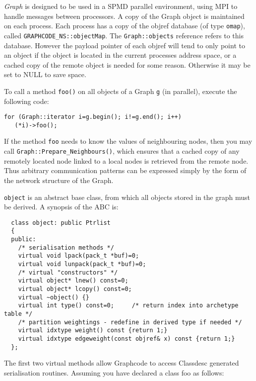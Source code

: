 
{\em Graph} is designed to be used in a SPMD parallel environment,
using MPI to handle messages between processors. A copy of the Graph
object is maintained on each process. Each process has a copy of the
objref database (of type \verb+omap+), called
\verb+GRAPHCODE_NS::objectMap+. The \verb+Graph::objects+ reference
refers to this database. However the payload pointer of each objref
will tend to only point to an object if the object is located in the
current processes address space, or a cached copy of the remote object
is needed for some reason. Otherwise it may be set to NULL to save
space.

To call a method \verb+foo()+ on all objects of a Graph \verb+g+ (in
parallel), execute the following code:
\begin{verbatim}
for (Graph::iterator i=g.begin(); i!=g.end(); i++)
   (*i)->foo();
\end{verbatim}

If the method \verb+foo+ needs to know the values of neighbouring
nodes, then you may call \verb+Graph::Prepare_Neighbours()+, which
ensures that a cached copy of any remotely located node linked to a
local nodes is retrieved from the remote node. Thus arbitrary
communication patterns can be expressed simply by the form of the
network structure of the Graph.

\label{object}

\verb+object+ is an abstract base class, from which all objects stored
in the graph must be derived. A synopsis of the ABC is:
\begin{verbatim}
  class object: public Ptrlist
  {
  public:
    /* serialisation methods */
    virtual void lpack(pack_t *buf)=0; 
    virtual void lunpack(pack_t *buf)=0;
    /* virtual "constructors" */
    virtual object* lnew() const=0;  
    virtual object* lcopy() const=0;  
    virtual ~object() {}
    virtual int type() const=0;     /* return index into archetype table */
    /* partition weightings - redefine in derived type if needed */
    virtual idxtype weight() const {return 1;}
    virtual idxtype edgeweight(const objref& x) const {return 1;}
  };
\end{verbatim}


The first two virtual methods allow Graphcode to access Classdesc
generated serialisation routines. Assuming you have declared a class
foo as follows:


